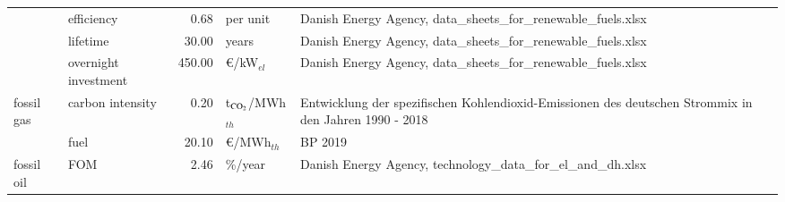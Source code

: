 \begin{longtable}{p{4cm}p{4cm}rp{3cm}p{10cm}}
                      & efficiency &         0.68 &                      per unit &                                                                                                                                                                                                                                                                       Danish Energy Agency, data\_sheets\_for\_renewable\_fuels.xlsx \\
                      & lifetime &        30.00 &                         years &                                                                                                                                                                                                                                                                       Danish Energy Agency, data\_sheets\_for\_renewable\_fuels.xlsx \\
                      & overnight investment &       450.00 &               \euro/kW$_{el}$ &                                                                                                                                                                                                                                                                       Danish Energy Agency, data\_sheets\_for\_renewable\_fuels.xlsx \\
fossil gas & carbon intensity &         0.20 &     t$_{\ce{CO2}}$/MWh$_{th}$ &                                                                                                                                                                                                                                Entwicklung der spezifischen Kohlendioxid-Emissionen des deutschen Strommix in den Jahren 1990 - 2018 \\
                      & fuel &        20.10 &              \euro/MWh$_{th}$ &                                                                                                                                                                                                                                                                                                                              BP 2019 \\
fossil oil & FOM &         2.46 &                       \%/year &                                                                                                                                                                                                                                                                        Danish Energy Agency, technology\_data\_for\_el\_and\_dh.xlsx \\

\end{longtable}
